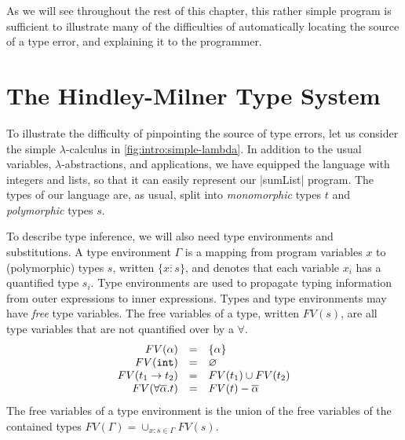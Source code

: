 As we will see throughout the rest of this chapter, this rather simple
program is sufficient to illustrate many of the difficulties of
automatically locating the source of a type error, and explaining it to
the programmer.

\section{The Hindley-Milner Type System}
\label{sec:intro:simple-type}

To illustrate the difficulty of pinpointing the source of type errors,
let us consider the simple $\lambda$-calculus in
\autoref{fig:intro:simple-lambda}.
%
In addition to the usual variables, $\lambda$-abstractions, and
applications, we have equipped the language with integers and lists, so
that it can easily represent our |sumList| program.
%
The types of our language are, as usual, split into \emph{monomorphic}
types $t$ and \emph{polymorphic} types $s$.
%

To describe type inference, we will also need type environments and
substitutions.
%
A type environment $\Gamma$ is a mapping from program variables $x$ to
(polymorphic) types $s$, written $\{\overline{x:s}\}$, and denotes that
each variable $x_i$ has a quantified type $s_i$.
%
Type environments are used to propagate typing information from outer
expressions to inner expressions. %
%
Types and type environments may have \emph{free} type variables.
%
The free variables of a type, written $FV(s)$, are all type
variables that are not quantified over by a $\forall$.
%
\[
\begin{array}{rcl}
FV(\alpha) &=& \{\alpha\} \\
FV(\mathtt{int})  &=& \varnothing \\
FV(t_1 \rightarrow t_2) &=& FV(t_1) \cup FV(t_2)\\
FV(\forall \overline{\alpha}. t) &=& FV(t) - \overline{\alpha}
\end{array}
\]
%
The free variables of a type environment is the union of the free variables
of the contained types $FV(\Gamma) = \cup_{x:s \in \Gamma}FV(s)$.


